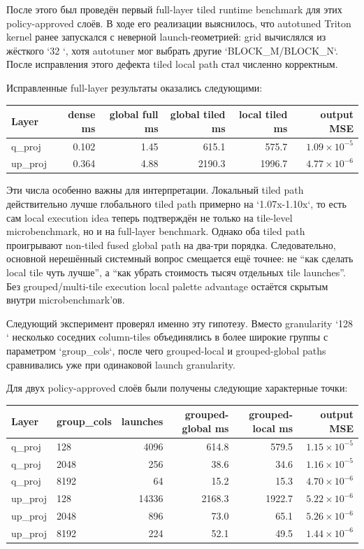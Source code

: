 После этого был проведён первый full-layer tiled runtime benchmark для этих
policy-approved слоёв. В ходе его реализации выяснилось, что autotuned Triton
kernel ранее запускался с неверной launch-геометрией: grid вычислялся из
жёсткого `32 `, хотя autotuner мог выбрать другие `BLOCK_M/BLOCK_N`.
После исправления этого дефекта tiled local path стал численно корректным.

Исправленные full-layer результаты оказались следующими:

\begin{center}
\begin{tabular}{lrrrrr}
\toprule
Layer & dense ms & global full ms & global tiled ms & local tiled ms & output MSE \\
\midrule
q\_proj & 0.102 & 1.45 & 615.1 & 575.7 & $1.09 \times 10^{-5}$ \\
up\_proj & 0.364 & 4.88 & 2190.3 & 1996.7 & $4.77 \times 10^{-6}$ \\
\bottomrule
\end{tabular}
\end{center}

Эти числа особенно важны для интерпретации. Локальный tiled path действительно
лучше глобального tiled path примерно на `1.07x-1.10x`, то есть сам local
execution idea теперь подтверждён не только на tile-level microbenchmark, но и
на full-layer benchmark. Однако оба tiled path проигрывают non-tiled fused
global path на два-три порядка. Следовательно, основной нерешённый системный
вопрос смещается ещё точнее: не ``как сделать local tile чуть лучше'', а
``как убрать стоимость тысяч отдельных tile launches''. Без grouped/multi-tile
execution local palette advantage остаётся скрытым внутри microbenchmark'ов.

Следующий эксперимент проверял именно эту гипотезу. Вместо granularity
`128 ` несколько соседних column-tiles объединялись в более широкие
группы с параметром `group\_cols`, после чего grouped-local и grouped-global
paths сравнивались уже при одинаковой launch granularity.

Для двух policy-approved слоёв были получены следующие характерные точки:

\begin{center}
\begin{tabular}{llrrrr}
\toprule
Layer & group\_cols & launches & grouped-global ms & grouped-local ms & output MSE \\
\midrule
q\_proj & 128 & 4096 & 614.8 & 579.5 & $1.15 \times 10^{-5}$ \\
q\_proj & 2048 & 256 & 38.6 & 34.6 & $1.16 \times 10^{-5}$ \\
q\_proj & 8192 & 64 & 15.2 & 15.3 & $4.70 \times 10^{-6}$ \\
up\_proj & 128 & 14336 & 2168.3 & 1922.7 & $5.22 \times 10^{-6}$ \\
up\_proj & 2048 & 896 & 73.0 & 65.1 & $5.26 \times 10^{-6}$ \\
up\_proj & 8192 & 224 & 52.1 & 49.5 & $1.44 \times 10^{-6}$ \\
\bottomrule
\end{tabular}
\end{center}

